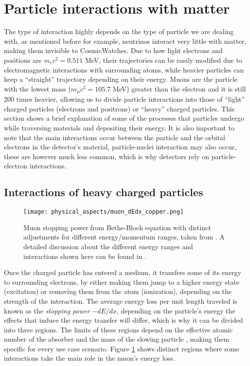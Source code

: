 \section{Particle interactions with matter}

The type of interaction highly depends on the type of particle we are dealing with, as mentioned before for example, neutrinos interact very little with matter, making them invisible to CosmicWatches. Due to how light electrons and positions are $m_ec^2=0.511$ \unit{\mega\eV}, their trajectories can be easily modified due to electromagnetic interactions with surrounding atoms, while heavier particles can keep a ``straight'' trajectory depending on their energy. Muons are the particle with the lowest mass ($m_\mu c^2=105.7$  \unit{\mega\eV}) greater than the electron and it is still 200 times heavier, allowing us to divide particle interactions into those of ``light'' charged particles (electrons and positrons) or ``heavy'' charged particles. This section shows a brief explanation of some of the processes that particles undergo while traversing materials and depositing their energy. It is also important to note that the main interactions occur between the particle and the orbital electrons in the detector's material, particle-nuclei interaction may also occur, these are however much less common, which is why detectors rely on particle-electron interactions.

\subsection{Interactions of heavy charged particles}

\begin{figure}
  \centering
  \texttt{[image: physical\_aspects/muon\_dEdx\_copper.png]}
  \caption{\label{fig:muon_dEdx}Muon stopping power from Bethe-Bloch equation with distinct adjustments for different energy/momentum ranges, taken from \cite{muon_dEdx}. A detailed discussion about the different energy ranges and interactions shown here can be found in \cite[sec.~32]{ReviewOfParticlePhysics}.}
\end{figure}

Once the charged particle has entered a medium, it transfers some of its energy to surrounding electrons, by either making them jump to a higher energy state (excitation) or removing them from the atom (ionization), depending on the strength of the interaction. The average energy loss per unit length traveled is known as the \textit{stopping power} $-dE/dx$, depending on the particle's energy the effects that induce the energy transfer will differ, which is why it can be divided into three regions. The limits of these regions depend on the effective atomic number of the absorber and the mass of the slowing particle \cite{ReviewOfParticlePhysics}, making them specific for every use case scenario. Figure \ref{fig:muon_dEdx} shows distinct regions where some interactions take the main role in the muon's energy loss.

